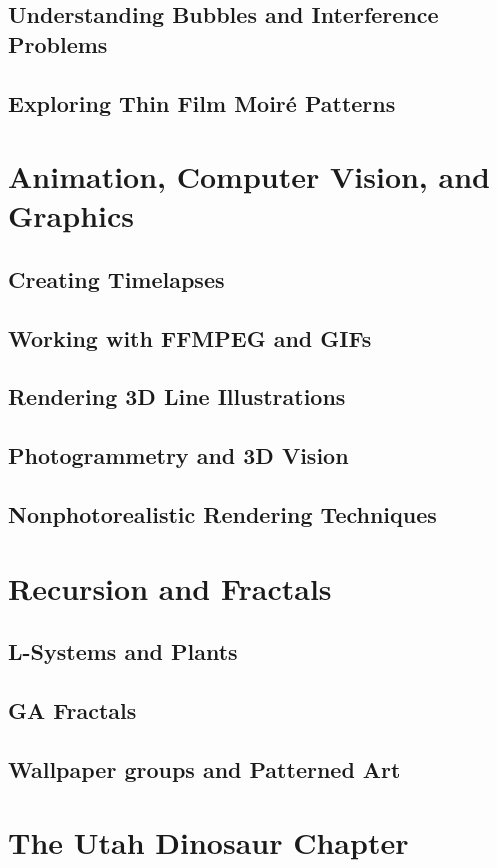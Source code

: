 \section{Understanding Bubbles and Interference Problems}
\section{Exploring Thin Film Moiré Patterns}

\chapter{Animation, Computer Vision, and Graphics}
\section{Creating Timelapses}
\section{Working with FFMPEG and GIFs}
\section{Rendering 3D Line Illustrations}
\section{Photogrammetry and 3D Vision}
\section{Nonphotorealistic Rendering Techniques}

\chapter{Recursion and Fractals}
\section{L-Systems and Plants}
\section{GA Fractals}
\section{Wallpaper groups and Patterned Art}

\chapter{The Utah Dinosaur Chapter}
